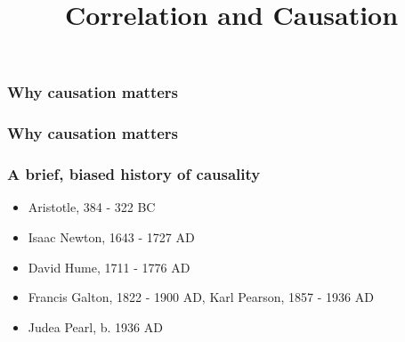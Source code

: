 


\title{Correlation and Causation}

\maketitle

\begin{frame}
\frametitle{Why causation matters}

   \centering

\cite{spurious-spiders-spelling}
\end{frame}

\begin{frame}
\frametitle{Why causation matters}
\centering
{}

\cite{estruch2013primary}
\end{frame}

\begin{frame}
\frametitle{A brief, biased history of causality}
\begin{itemize}
\item Aristotle, 384 - 322 BC
\item Isaac Newton, 1643 - 1727 AD
\item David Hume, 1711 - 1776 AD
\item Francis Galton, 1822 - 1900 AD, Karl Pearson, 1857 - 1936 AD
\item Judea Pearl, b. 1936 AD
\end{itemize}
\end{frame}

